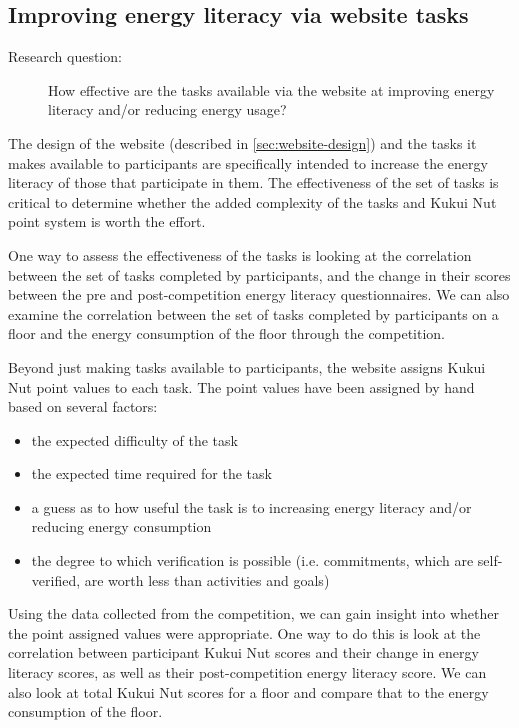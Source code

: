 \subsection{Improving energy literacy via website tasks}

\begin{description}
\item[Research question:] How effective are the tasks available via the website at improving energy literacy and/or reducing energy usage?
\end{description}

The design of the website (described in \autoref{sec:website-design}) and the tasks it makes available to participants are specifically intended to increase the energy literacy of those that participate in them. The effectiveness of the set of tasks is critical to determine whether the added complexity of the tasks and Kukui Nut point system is worth the effort.

One way to assess the effectiveness of the tasks is looking at the correlation between the set of tasks completed by participants, and the change in their scores between the pre and post-competition energy literacy questionnaires. We can also examine the correlation between the set of tasks completed by participants on a floor and the energy consumption of the floor through the competition.

Beyond just making tasks available to participants, the website assigns Kukui Nut point values to each task. The point values have been assigned by hand based on several factors:

\begin{itemize}
\item the expected difficulty of the task
\item the expected time required for the task
\item a guess as to how useful the task is to increasing energy literacy and/or reducing energy consumption
\item the degree to which verification is possible (i.e. commitments, which are self-verified, are worth less than activities and goals)
\end{itemize}

Using the data collected from the competition, we can gain insight into whether the point assigned values were appropriate. One way to do this is look at the correlation between participant Kukui Nut scores and their change in energy literacy scores, as well as their post-competition energy literacy score. We can also look at total Kukui Nut scores for a floor and compare that to the energy consumption of the floor.

